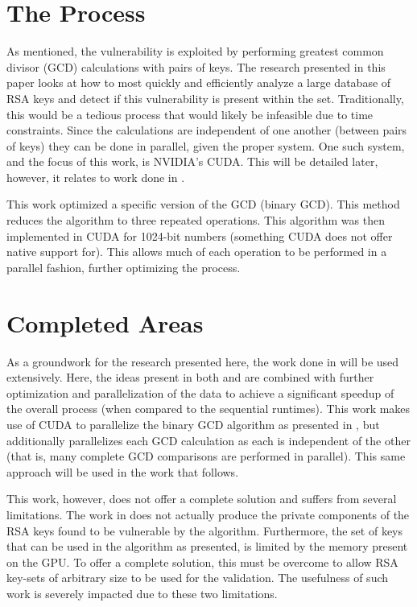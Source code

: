 \documentclass[12pt]{ucthesis}
\begin{document}
\section{The Process}
As mentioned, the vulnerability is exploited by performing greatest common
divisor (GCD) calculations with pairs of keys. The research presented in this
paper looks at how to most quickly and efficiently analyze a large database of
RSA keys and detect if this vulnerability is present within the set.
Traditionally, this would be a tedious process that would likely be infeasible
due to time constraints. Since the calculations are independent of one another
(between pairs of keys) they can be done in parallel, given the proper system.
One such system, and the focus of this work, is NVIDIA's CUDA. This will be
detailed later, however, it relates to work done in \cite{fujimoto2009high}. 

This work optimized a specific version of the GCD (binary GCD). This method
reduces the algorithm to three repeated operations. This algorithm was then
implemented in CUDA for 1024-bit numbers (something CUDA does not offer native
support for). This allows much of each operation to be performed in a parallel
fashion, further optimizing the process.

\section{Completed Areas}
As a groundwork for the research presented here, the work done in
\cite{scharfglass2012breaking} will be used extensively. Here, the ideas present in
both \cite{lenstra2012ron} and \cite{fujimoto2009high} are combined with
further optimization and parallelization of the data to achieve a significant
speedup of the overall process (when compared to the sequential runtimes). This
work makes use of CUDA to parallelize the binary GCD algorithm as presented in
\cite{fujimoto2009high}, but additionally parallelizes each GCD calculation as
each is independent of the other (that is, many complete GCD comparisons are 
performed in parallel). This same approach will be used in the work that follows.

This work, however, does not offer a complete solution and suffers from several
limitations. The work in \cite{scharfglass2012breaking} does not actually produce
the private components of the RSA keys found to be vulnerable by the algorithm.
Furthermore, the set of keys that can be used in the algorithm as presented, is
limited by the memory present on the GPU. To offer a complete solution, this
must be overcome to allow RSA key-sets of arbitrary size to be used for the
validation. The usefulness of such work is severely impacted due to these two
limitations.
\end{document}
